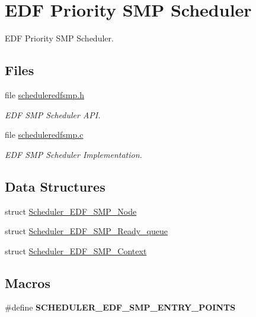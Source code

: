 \hypertarget{group__RTEMSScoreSchedulerSMPEDF}{}\section{E\+DF Priority S\+MP Scheduler}
\label{group__RTEMSScoreSchedulerSMPEDF}


E\+DF Priority S\+MP Scheduler.  


\subsection*{Files}
\begin{DoxyCompactItemize}
\item 
file \mbox{\hyperlink{scheduleredfsmp_8h}{scheduleredfsmp.\+h}}
\begin{DoxyCompactList}\small\item\em E\+DF S\+MP Scheduler A\+PI. \end{DoxyCompactList}\item 
file \mbox{\hyperlink{scheduleredfsmp_8c}{scheduleredfsmp.\+c}}
\begin{DoxyCompactList}\small\item\em E\+DF S\+MP Scheduler Implementation. \end{DoxyCompactList}\end{DoxyCompactItemize}
\subsection*{Data Structures}
\begin{DoxyCompactItemize}
\item 
struct \mbox{\hyperlink{structScheduler__EDF__SMP__Node}{Scheduler\+\_\+\+E\+D\+F\+\_\+\+S\+M\+P\+\_\+\+Node}}
\item 
struct \mbox{\hyperlink{structScheduler__EDF__SMP__Ready__queue}{Scheduler\+\_\+\+E\+D\+F\+\_\+\+S\+M\+P\+\_\+\+Ready\+\_\+queue}}
\item 
struct \mbox{\hyperlink{structScheduler__EDF__SMP__Context}{Scheduler\+\_\+\+E\+D\+F\+\_\+\+S\+M\+P\+\_\+\+Context}}
\end{DoxyCompactItemize}
\subsection*{Macros}
\begin{DoxyCompactItemize}
\item 
\#define {\bfseries S\+C\+H\+E\+D\+U\+L\+E\+R\+\_\+\+E\+D\+F\+\_\+\+S\+M\+P\+\_\+\+E\+N\+T\+R\+Y\+\_\+\+P\+O\+I\+N\+TS}
\end{DoxyCompactItemize}
